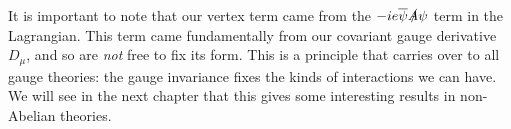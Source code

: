 \br 
    It is important to note that our vertex term came from the $-ie\overline{\psi}\slashed{A}\psi$ term in the Lagrangian. This term came fundamentally from our covariant gauge derivative $D_{\mu}$, and so are \textit{not} free to fix its form. This is a principle that carries over to all gauge theories: the gauge invariance fixes the kinds of interactions we can have. We will see in the next chapter that this gives some interesting results in non-Abelian theories. 
\er 